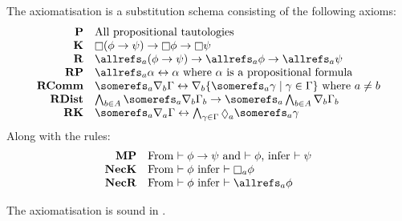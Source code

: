 \begin{definition}
The axiomatisation \axiomKF{} is a substitution schema consisting of the
following axioms:
$$
\begin{array}{rl}
{\bf P} & \text{All propositional tautologies}\\
{\bf K} & \knows (\phi \implies \psi) \implies \knows \phi \implies \knows
\psi\\
{\bf R} & \allrefs_a (\phi \implies \psi) \implies \allrefs_a \phi \implies
\allrefs_a \psi\\
{\bf RP} & \allrefs_a \alpha \iff \alpha \text{ where $\alpha$ is a
propositional formula}\\
{\bf RComm} & \somerefs_a \covers_b \Gamma \iff \covers_b \{\somerefs_a \gamma
\mid \gamma \in \Gamma\} \text{ where $a \neq b$}\\
{\bf RDist} & \bigwedge_{b \in A} \somerefs_a \covers_b \Gamma_b \implies
\somerefs_a \bigwedge_{b \in A} \covers_b \Gamma_b\\
{\bf RK} & \somerefs_a \covers_a \Gamma \iff \bigwedge_{\gamma \in \Gamma}
\suspects_a \somerefs_a \gamma\\
\end{array}
$$
Along with the rules:
$$
\begin{array}{rl}
{\bf MP} & \text{From $\proves \phi \implies \psi$ and $\proves \phi$, infer
$\proves \psi$}\\
{\bf NecK} & \text{From $\proves \phi$ infer $\proves \knows_a \phi$}\\
{\bf NecR} & \text{From $\proves \phi$ infer $\proves \allrefs_a \phi$}
\end{array}
$$
\end{definition}

\begin{lemma}\label{k-sound}
The axiomatisation \axiomKF{} is sound in \logicKF{}.
\end{lemma}

